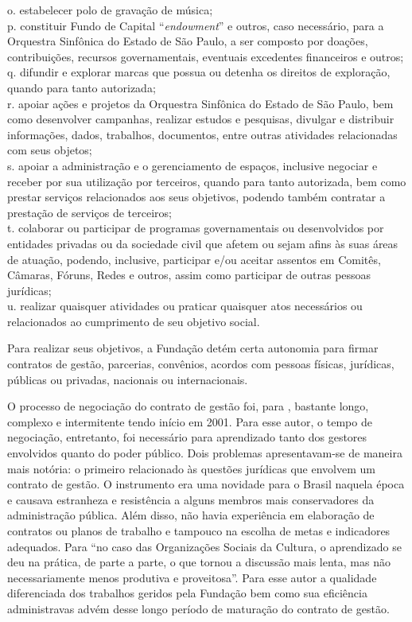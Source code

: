\documentclass[a4paper, 12pt, openright, oneside, german, french, english, brazil]{abntex2}
\begin{document}
\begin{citacao}
		o. estabelecer polo de gravação de música;\\
		p. constituir Fundo de Capital ``\textit{endowment}'' e outros, caso necessário, para a Orquestra Sinfônica do Estado de São Paulo, a ser composto por doações, contribuições, recursos governamentais, eventuais excedentes financeiros e outros;\\
		q. difundir e explorar marcas que possua ou detenha os direitos de exploração, quando para tanto autorizada;\\
		r. apoiar ações e projetos da Orquestra Sinfônica do Estado de São Paulo, bem como desenvolver campanhas, realizar estudos e pesquisas, divulgar e distribuir informações, dados, trabalhos, documentos, entre outras atividades relacionadas com seus objetos;\\
		s. apoiar a administração e o gerenciamento de espaços, inclusive negociar e receber por sua utilização por terceiros, quando para tanto autorizada, bem como prestar serviços relacionados aos seus objetivos, podendo também contratar a prestação de serviços de terceiros;\\
		t. colaborar ou participar de programas governamentais ou desenvolvidos por entidades privadas ou da sociedade civil que afetem ou sejam afins às suas áreas de atuação, podendo, inclusive, participar e/ou aceitar assentos em Comitês, Câmaras, Fóruns, Redes e outros, assim como participar de outras pessoas jurídicas;\\
		u. realizar quaisquer atividades ou praticar quaisquer atos necessários ou relacionados ao cumprimento de seu objetivo social.
		\cite[p. 2]{osesp2013estatuto}
	\end{citacao}
	
	Para realizar seus objetivos, a Fundação detém certa autonomia para firmar contratos de gestão, parcerias, convênios, acordos com pessoas físicas, jurídicas, públicas ou privadas, nacionais ou internacionais. 
	
	O processo de negociação do contrato de gestão foi, para , bastante longo, complexo e intermitente tendo início em 2001. Para esse autor, o tempo de negociação, entretanto, foi necessário para aprendizado tanto dos gestores envolvidos quanto do poder público. Dois problemas apresentavam-se de maneira mais notória: o primeiro relacionado às questões jurídicas que envolvem um contrato de gestão. O instrumento era uma novidade para o Brasil naquela época e causava estranheza e resistência a alguns membros mais conservadores da administração pública. Além disso, não havia experiência em elaboração de contratos ou planos de trabalho e tampouco na escolha de metas e indicadores adequados. Para  ``no caso das Organizações Sociais da Cultura, o aprendizado se deu na prática, de parte a parte, o que tornou a discussão mais lenta, mas não necessariamente menos produtiva e proveitosa''. Para esse autor a qualidade diferenciada dos trabalhos geridos pela Fundação bem como sua eficiência administravas advém desse longo período de maturação do contrato de gestão.
	
\end{document}
